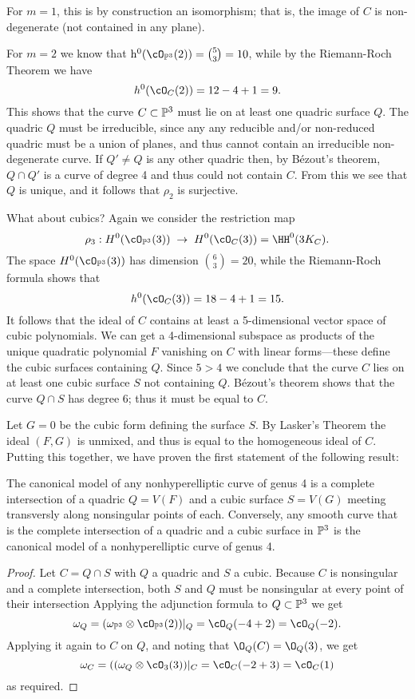 For $m=1$, this is by construction an isomorphism; that is, the image of $C$ is non-degenerate (not contained in any plane).

For $m=2$ we know that $\h^0(\cO_{\PP^3}(2)) = \binom{5}{3} = 10$, while by the Riemann-Roch
Theorem we have
$$
h^0(\cO_C(2)) = 12 - 4 + 1 = 9.
$$
This shows that the curve $C \subset \PP^3$ must lie on at least one quadric surface $Q$. The quadric $Q$ must be irreducible, since any any reducible and/or non-reduced quadric must be a union of planes, and thus cannot contain an irreducible non-degenerate curve.
If $Q'\neq Q$ is any other quadric then, by B\'ezout's theorem, $Q\cap Q'$ is a curve of degree 4 and thus could not contain $C$. From this we see that $Q$ is unique, and it follows that $\rho_2$ is surjective.

What about cubics? Again we consider the restriction map
$$
\rho_3 : H^0(\cO_{\PP^3}(3)) \; \to \; H^0(\cO_{C}(3)) = \HH^0(3K_C).
$$
The space $H^0(\cO_{\PP^3}(3))$ has dimension $\binom{6}{3} = 20$, while  the Riemann-Roch formula shows that
$$
h^0(\cO_C(3)) = 18 - 4 + 1 = 15.
$$
It follows that the ideal of $C$ contains at least a 5-dimensional vector space of cubic polynomials. We can get a 4-dimensional subspace as products of the unique quadratic polynomial $F$ vanishing on $C$ with linear forms---these define the cubic surfaces containing $Q$. Since $5 > 4$ we  conclude that the curve $C$ lies on at least one cubic surface $S$  not containing $Q$. 
B\'ezout's theorem shows that the curve $Q \cap S$ has degree 6; thus it must be equal to $C$. 

Let $G=0$ be the cubic form defining the surface $S$. By Lasker's Theorem the ideal $(F,G)$ is unmixed, and thus is equal to the homogeneous ideal of $C$. Putting this together, we have proven the first statement of the following result:

\begin{theorem}
The canonical model of any nonhyperelliptic curve of genus 4 is a complete intersection of a quadric $Q = V(F)$ and a cubic surface $S = V(G)$ meeting transversly along nonsingular points of each. Conversely, any smooth curve that is the complete intersection of a quadric and a cubic surface in $\PP^3$ is the canonical model of a nonhyperelliptic curve of genus 4.
\end{theorem}
 
\begin{proof}
Let $C = Q\cap S$ with $Q$ a quadric and $S$ a cubic. Because $C$ is nonsingular and a complete intersection, both $S$ and $Q$ must be nonsingular at every point of their intersection Applying the adjunction formula to $Q\subset \PP^3$ we get
$$
\omega_Q = (\omega_{\PP^3} \otimes \cO_{\PP^3}(2))|_Q = \cO_Q(-4+2) = \cO_Q(-2).
$$
Applying it again to $C$ on $Q$, and noting that $\O_Q(C) = \O_Q(3)$, we get
$$
\omega_C = ((\omega_{Q} \otimes \cO_{3}(3))|_C = \cO_C(-2+3) = \cO_C(1)
$$
as required. 
\end{proof}


